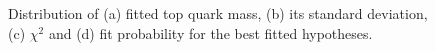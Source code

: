 \begin{figure}[!htp]
   \centering
   \hfill
   \caption{\label{fig:fitplots}Distribution of (a) fitted top quark mass, (b) its standard deviation, (c) $\chi^{2}$
   and (d) fit probability for the best fitted hypotheses.}
\end{figure}


